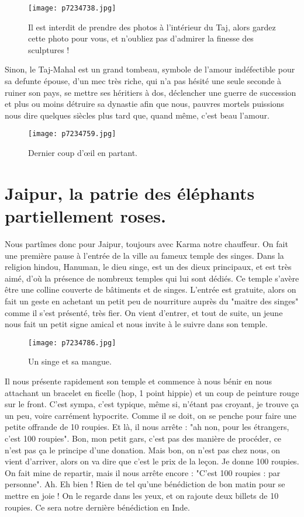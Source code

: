 \documentclass{book}
\begin{document}
\begin{figure}[h]
\centering
\texttt{[image: p7234738.jpg]}
\caption*{Il est interdit de prendre des photos à l'intérieur du Taj, alors gardez cette photo pour vous, et n'oubliez pas d'admirer la finesse des sculptures !}
\end{figure}

Sinon, le Taj-Mahal est un grand tombeau, symbole de l'amour indéfectible pour sa defunte épouse, d'un mec très riche, qui n'a pas hésité une seule seconde à ruiner son pays, se mettre ses héritiers à dos, déclencher une guerre de succession et plus ou moins détruire sa dynastie afin que nous, pauvres mortels puissions nous dire quelques siècles plus tard que, quand même, c'est beau l'amour.


\begin{figure}[h]
\centering
\texttt{[image: p7234759.jpg]}
\caption*{Dernier coup d’œil en partant.}
\end{figure}





\chapter{Jaipur, la patrie des éléphants partiellement roses.}
Nous partîmes donc pour Jaipur, toujours avec Karma notre chauffeur. On fait une première pause à l'entrée de la ville au fameux temple des singes. Dans la religion hindou, Hanuman, le dieu singe, est un des dieux principaux, et est très aimé, d'où la présence de nombreux temples qui lui sont dédiés. Ce temple s'avère être une colline couverte de bâtiments et de singes. L'entrée est gratuite, alors on fait un geste en achetant un petit peu de nourriture auprès du "maitre des singes" comme il s'est présenté, très fier. On vient d'entrer, et tout de suite, un jeune nous fait un petit signe amical et nous invite à le suivre dans son temple.


\begin{figure}[h]
\centering
\texttt{[image: p7234786.jpg]}
\caption*{Un singe et sa mangue.}
\end{figure}

Il nous présente rapidement son temple et commence à nous bénir en nous attachant un bracelet en ficelle (hop, 1 point hippie) et un coup de peinture rouge sur le front. C'est sympa, c'est typique, même si, n'étant pas croyant, je trouve ça un peu, voire carrément hypocrite. Comme il se doit, on se penche pour faire une petite offrande de 10 roupies. Et là, il nous arrête : "ah non, pour les étrangers, c'est 100 roupies". Bon, mon petit gars, c'est pas des manière de procéder, ce n'est pas ça le principe d'une donation. Mais bon, on n'est pas chez nous, on vient d'arriver, alors on va dire que c'est le prix de la leçon. Je donne 100 roupies. On fait mine de repartir, mais il nous arrête encore : "C'est 100 roupies : par personne". Ah. Eh bien ! Rien de tel qu'une bénédiction de bon matin pour se mettre en joie ! On le regarde dans les yeux, et on rajoute deux billets de 10 roupies. Ce sera notre dernière bénédiction en Inde.
\end{document}

